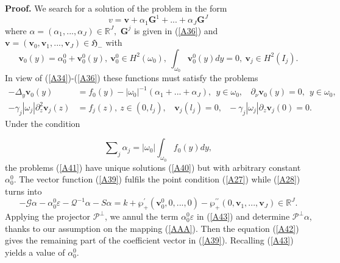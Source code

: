 \documentclass[11pt]{article}%
\numberwithin{equation}{section}
\begin{document}
\textbf{Proof. }We search for a solution of the problem in the form%
\begin{equation}
v=\mathbf{v}+\alpha_{1}\mathbf{G}^{1}+...+\alpha_{J}\mathbf{G}^{J} \label{A39}%
\end{equation}
where $\alpha=(\alpha_{1},...,\alpha_{J})\in\mathbb{R}^{J},$ $\mathbf{G}^{j}$
is given in (\ref{A36}) and $\mathbf{v}=(\mathbf{v}_{0},\mathbf{v}%
_{1},...,\mathbf{v}_{J})\in\mathfrak{H}_{-}$ with%
\begin{equation}
\mathbf{v}_{0}(y)=\alpha_{0}^{0}+\mathbf{v}_{0}^{0}(y),\ \mathbf{v}_{0}^{0}\in
H^{2}(\omega_{0}),\ \int_{\omega_{0}}\mathbf{v}_{0}^{0}(y)dy=0,\ \mathbf{v}%
_{j}\in H^{2}(I_{j}). \label{A40}%
\end{equation}
In view of (\ref{A34})-(\ref{A36}) these functions must satisfy the problems%
\begin{align}
-\Delta_{y}\mathbf{v}_{0}(y)  &  =f_{0}(y)-|\omega_{0}|^{-1}(\alpha
_{1}+...+\alpha_{J}),\ \ y\in\omega_{0},\ \ \ \ \partial_{\nu}\mathbf{v}%
_{0}(y)=0,\ \ y\in\omega_{0},\label{A41}\\
-\gamma_{j}|\omega_{j}|\partial_{z}^{2}\mathbf{v}_{j}(z)  &  =f_{j}%
(z),\ z\in(0,l_{j}),\ \ \ \ \mathbf{v}_{j}(l_{j})=0,\ \ \ -\gamma_{j}%
|\omega_{j}|\partial_{z}\mathbf{v}_{j}(0)=0.\nonumber
\end{align}
Under the condition%

\begin{equation}%
{\textstyle\sum\nolimits_{j}}
\alpha_{j}=|\omega_{0}|\int_{\omega_{0}}f_{0}(y)dy, \label{A42}%
\end{equation}
the problems (\ref{A41}) have unique solutions (\ref{A40}) but with arbitrary
constant $\alpha_{0}^{0}$. The vector function (\ref{A39}) fulfils the point
condition (\ref{A27}) while (\ref{A28}) turns into%
\begin{equation}
-\mathcal{G}\alpha-\alpha_{0}^{0}\varepsilon-\mathcal{Q}^{-1}\alpha
-S\alpha=k+\wp_{+}^{\prime}(\mathbf{v}_{0}^{0},0,...,0)-\wp_{+}^{\prime\prime
}(0,\mathbf{v}_{1},...,\mathbf{v}_{J})\in\mathbb{R}^{J}. \label{A43}%
\end{equation}
Applying the projector $\mathcal{P}^{\bot}$, we annul the term $\alpha_{0}%
^{0}\varepsilon$ in (\ref{A43}) and determine $\mathcal{P}^{\bot}\alpha$,
thanks to our assumption on the mapping (\ref{AAA}). Then the equation
(\ref{A42}) gives the remaining part of the coefficient vector in (\ref{A39}).
Recalling (\ref{A43}) yields a value of $\alpha_{0}^{0}$.
\end{document}
